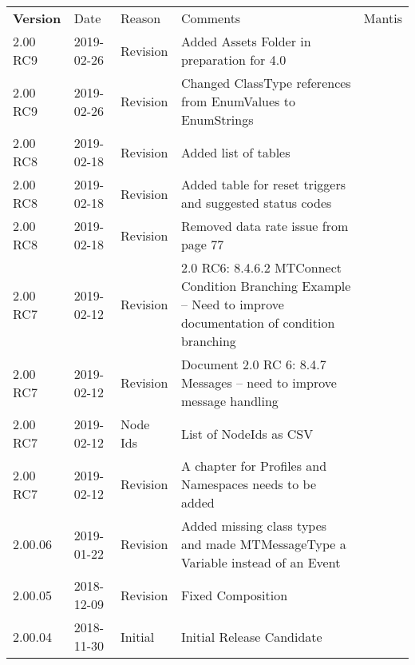\documentclass{mtc-opc}	%
\begin{document}
\begin{nolinenumbers}
\begin{table}[ht]
    \centering
    \fontsize{9pt}{11pt}\selectfont
    \tabulinesep=3pt
    \begin{tabu} to 6in {|X[-1]|X[-1.25]|X[-0.75]|X[5.25]|X[-0.75]|} \everyrow{\hline}
        \hline
        \rowfont \bfseries Version & Date & Reason & Comments & Mantis \\
        2.00 RC9 & 2019-02-26 & Revision & Added Assets Folder in preparation for 4.0 &  \\
        2.00 RC9 & 2019-02-26 & Revision & Changed ClassType references from EnumValues to EnumStrings &  \\
        2.00 RC8 & 2019-02-18 & Revision & Added list of tables &  \\
        2.00 RC8 & 2019-02-18 & Revision & Added table for reset triggers and suggested status codes &  \\
        2.00 RC8 & 2019-02-18 & Revision & Removed data rate issue from page 77 &  \\
        2.00 RC7 & 2019-02-12 & Revision & 2.0 RC6: 8.4.6.2 MTConnect Condition Branching Example -- Need to improve documentation of condition branching &  \\        
        2.00 RC7 & 2019-02-12 & Revision & Document 2.0 RC 6: 8.4.7 Messages -- need to improve message handling &  \\
        2.00 RC7 & 2019-02-12 & Node Ids & List of NodeIds as CSV &  \\
        2.00 RC7 & 2019-02-12 & Revision & A chapter for Profiles and Namespaces needs to be added &   \\
        2.00.06 & 2019-01-22 & Revision & Added missing class types and made MTMessageType a Variable instead of an Event &\\
        2.00.05 & 2018-12-09 & Revision & Fixed Composition & \\
        2.00.04 & 2018-11-30 & Initial & Initial Release Candidate & \\ 
    \end{tabu}
\end{table}

\clearpage
\tableofcontents
\thispagestyle{fancy}

\clearpage
\listoffigures

\clearpage
\listoftables

\clearpage

\end{nolinenumbers}
\end{document}
